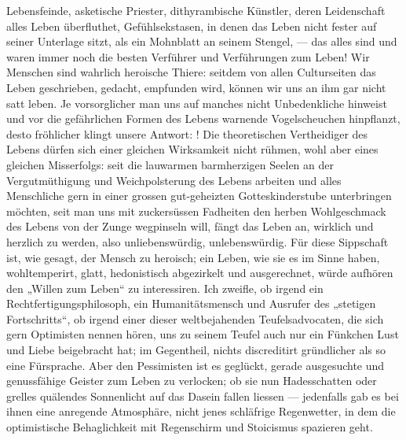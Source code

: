 Lebensfeinde, asketische Priester, dithyrambische Künstler, deren Leidenschaft alles Leben überfluthet, Gefühlsekstasen, in denen das Leben nicht fester auf seiner Unterlage sitzt, als ein Mohnblatt an seinem Stengel, — das alles sind und waren immer noch die besten Verführer und Verführungen zum Leben! Wir Menschen sind wahrlich heroische Thiere: seitdem von allen Culturseiten  das Leben geschrieben, gedacht, empfunden wird, können wir uns an ihm gar nicht satt leben. Je vorsorglicher man uns auf manches nicht Unbedenkliche hinweist und vor die gefährlichen Formen des Lebens warnende Vogelscheuchen hinpflanzt, desto fröhlicher klingt unsere Antwort: ! Die theoretischen Vertheidiger des Lebens dürfen sich einer gleichen Wirksamkeit nicht rühmen, wohl aber eines gleichen Misserfolgs: seit die lauwarmen barmherzigen Seelen an der Vergutmüthigung und Weichpolsterung des Lebens arbeiten und alles Menschliche gern in einer grossen gut-geheizten Gotteskinderstube unterbringen möchten, seit man uns mit zuckersüssen Fadheiten den herben Wohlgeschmack des Lebens von der Zunge wegpinseln will, fängt das Leben an, wirklich und herzlich  zu werden, also unliebenswürdig, unlebenswürdig. Für diese Sippschaft ist, wie gesagt, der Mensch zu heroisch; ein Leben, wie sie es im Sinne haben, wohltemperirt, glatt, hedonistisch abgezirkelt und ausgerechnet, würde aufhören den „Willen zum Leben“ zu interessiren. Ich zweifle, ob irgend ein Rechtfertigungsphilosoph, ein Humanitätsmensch und Ausrufer des „stetigen Fortschritts“, ob irgend einer dieser weltbejahenden Teufelsadvocaten, die sich gern Optimisten nennen hören, uns zu seinem Teufel auch nur ein Fünkchen Lust und Liebe beigebracht hat; im Gegentheil, nichts discreditirt gründlicher als so eine Fürsprache. Aber den Pessimisten ist es geglückt, gerade ausgesuchte und genussfähige Geister zum Leben zu verlocken; ob sie nun Hadesschatten oder grelles quälendes Sonnenlicht auf das Dasein fallen liessen — jedenfalls gab es bei ihnen eine anregende Atmosphäre, nicht jenes schläfrige Regenwetter, in dem die optimistische Behaglichkeit mit Regenschirm und Stoicismus spazieren geht.
\par

